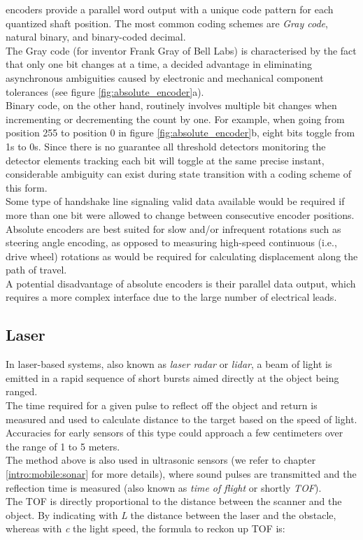 encoders provide a parallel word output with a unique code pattern for each
quantized shaft position. The most common coding schemes are \textit{Gray code},
natural binary, and binary-coded decimal.
\\
The Gray code (for inventor Frank Gray of Bell Labs) is characterised by the
fact that only one bit changes at a time, a decided advantage in eliminating
asynchronous ambiguities caused by electronic and mechanical component tolerances
(see figure \ref{fig:absolute_encoder}a).
\\
Binary code, on the other hand, routinely involves multiple bit changes when
incrementing or decrementing the count by one. For example, when going from
position 255 to position 0 in figure \ref{fig:absolute_encoder}b, eight
bits toggle from 1s to 0s. Since
there is no guarantee all threshold detectors monitoring the detector elements
tracking each bit will toggle at the same precise instant, considerable ambiguity
can exist during state transition with a coding scheme of this form.
\\
Some type of handshake line signaling valid data available would be required
if more than one bit were allowed to change between consecutive encoder positions.
\\
Absolute encoders are best suited for slow and/or infrequent rotations such
as steering angle encoding, as opposed to measuring high-speed continuous
(i.e., drive wheel) rotations as would be required for calculating displacement
along the path of travel.
\\
A potential disadvantage of absolute encoders is their parallel data output,
which requires a more complex interface due to the large number of electrical leads.


\subsection{Laser}
\label{intro:mobile:laser}

In laser-based systems, also known as \textit{laser radar} or
\textit{lidar}, a beam of light is emitted in a rapid sequence
of short bursts aimed directly at the object being ranged.
\\
The time required for a given pulse to reflect off the object
and return is measured and used to calculate distance to the
target based on the speed of light. Accuracies for early sensors
of this type could approach a few centimeters over the range
of 1 to 5 meters.
\\
The method above is also used in ultrasonic sensors (we refer to
chapter \ref{intro:mobile:sonar} for more details), where sound pulses
are transmitted and the reflection time is measured (also known as
\textit{time of flight} or shortly \textit{TOF}).
\\
The TOF is directly proportional to the distance between the scanner
and the object. By indicating with \textit{L} the distance between
the laser and the obstacle, whereas with \textit{c} the light speed,
the formula to reckon up TOF is:

